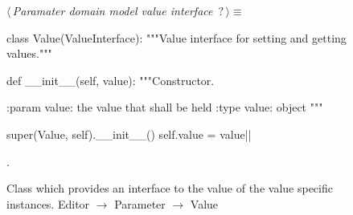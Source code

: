\documentclass[%
    a4paper,    %
    justified,  %
    nobib,      %
    openany     %
]{tufte-book}
\begin{document}
\begin{figure}
\begin{flushleft} \small
\begin{minipage}{\linewidth}\label{scrap131}\raggedright\small
{} $\langle\,${\itshape Paramater domain model value interface}\nobreak\ {\footnotesize {?}}$\,\rangle\equiv$
\vspace{-1ex}
\begin{pythoncode}
class Value(ValueInterface):
    """Value interface for setting and getting values."""

    def __init__(self, value):
        """Constructor.

        :param value: the value that shall be held
        :type  value: object
        """

        super(Value, self).__init__()
        self.value = value|\NWsep|
\end{pythoncode}
\vspace{1.5ex}
\footnotesize
\begin{list}{}{\setlength{\itemsep}{-\parsep}\setlength{\itemindent}{-\leftmargin}}
\item {\NWtxtMacroNoRef}.

\item{}
\end{list}
\end{minipage}\vspace{4ex}
\end{flushleft}
\caption{Class which provides an interface to the value of the value specific
  instances.
  \newline{}\newline{}Editor $\rightarrow$ Parameter $\rightarrow$
  Value}
\label{editor:lst:parameter:value}
\end{figure}
\end{document}
